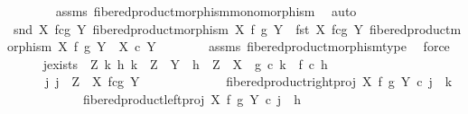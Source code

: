 \begin{isabellebody}
\ \ \ \ \ \ \isamarkupfalse%
\ assms{\isacharparenleft}{\kern0pt}{}{\isacharcomma}{\kern0pt}{}{\isacharparenright}{\kern0pt}\ fibered{\isacharunderscore}{\kern0pt}product{\isacharunderscore}{\kern0pt}morphism{\isacharunderscore}{\kern0pt}monomorphism\ \isamarkupfalse%
\ auto\isanewline
\ \ \ \ \isamarkupfalse%
\ {\isachardoublequoteopen}snd\ {\isacharparenleft}{\kern0pt}X\ \isactrlbsub f\isactrlesub {\isasymtimes}\isactrlsub c\isactrlbsub g\isactrlesub \ Y{\isacharcomma}{\kern0pt}\ fibered{\isacharunderscore}{\kern0pt}product{\isacharunderscore}{\kern0pt}morphism\ X\ f\ g\ Y{\isacharparenright}{\kern0pt}\ {\isacharcolon}{\kern0pt}\ fst\ {\isacharparenleft}{\kern0pt}X\ \isactrlbsub f\isactrlesub {\isasymtimes}\isactrlsub c\isactrlbsub g\isactrlesub \ Y{\isacharcomma}{\kern0pt}\ fibered{\isacharunderscore}{\kern0pt}product{\isacharunderscore}{\kern0pt}morphism\ X\ f\ g\ Y{\isacharparenright}{\kern0pt}\ {\isasymrightarrow}\ X\ {\isasymtimes}\isactrlsub c\ Y{\isachardoublequoteclose}\isanewline
\ \ \ \ \ \ \isamarkupfalse%
\ assms{\isacharparenleft}{\kern0pt}{}{\isacharcomma}{\kern0pt}{}{\isacharparenright}{\kern0pt}\ fibered{\isacharunderscore}{\kern0pt}product{\isacharunderscore}{\kern0pt}morphism{\isacharunderscore}{\kern0pt}type\ \isamarkupfalse%
\ force\isanewline
\ \ \ \ \isamarkupfalse%
\ j{\isacharunderscore}{\kern0pt}exists{\isacharcolon}{\kern0pt}\ {\isachardoublequoteopen}{\isasymAnd}\ Z\ k\ h{\isachardot}{\kern0pt}\ k\ {\isacharcolon}{\kern0pt}\ Z\ {\isasymrightarrow}\ Y\ {\isasymLongrightarrow}\ h\ {\isacharcolon}{\kern0pt}\ Z\ {\isasymrightarrow}\ X\ {\isasymLongrightarrow}\ g\ {\isasymcirc}\isactrlsub c\ k\ {\isacharequal}{\kern0pt}\ f\ {\isasymcirc}\isactrlsub c\ h\ {\isasymLongrightarrow}\isanewline
\ \ \ \ \ \ {\isacharparenleft}{\kern0pt}{\isasymexists}{\isacharbang}{\kern0pt}j{\isachardot}{\kern0pt}\ j\ {\isacharcolon}{\kern0pt}\ Z\ {\isasymrightarrow}\ X\ \isactrlbsub f\isactrlesub {\isasymtimes}\isactrlsub c\isactrlbsub g\isactrlesub \ Y\ {\isasymand}\isanewline
\ \ \ \ \ \ \ \ \ \ \ \ fibered{\isacharunderscore}{\kern0pt}product{\isacharunderscore}{\kern0pt}right{\isacharunderscore}{\kern0pt}proj\ X\ f\ g\ Y\ {\isasymcirc}\isactrlsub c\ j\ {\isacharequal}{\kern0pt}\ k\ {\isasymand}\isanewline
\ \ \ \ \ \ \ \ \ \ \ \ fibered{\isacharunderscore}{\kern0pt}product{\isacharunderscore}{\kern0pt}left{\isacharunderscore}{\kern0pt}proj\ X\ f\ g\ Y\ {\isasymcirc}\isactrlsub c\ j\ {\isacharequal}{\kern0pt}\ h{\isacharparenright}{\kern0pt}{\isachardoublequoteclose}\isanewline

\end{isabellebody}
